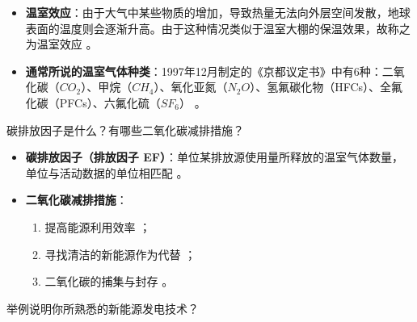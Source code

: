 \begin{solution}
\begin{itemize}
\item \textbf{温室效应}：由于大气中某些物质的增加，导致热量无法向外层空间发散，地球表面的温度则会逐渐升高。由于这种情况类似于温室大棚的保温效果，故称之为温室效应 。
\item \textbf{通常所说的温室气体种类}：1997年12月制定的《京都议定书》中有6种：二氧化碳（\(CO_2\)）、甲烷（\(CH_4\)）、氧化亚氮（\(N_2O\)）、氢氟碳化物（HFCs）、全氟化碳（PFCs）、六氟化硫（\(SF_6\)） 。
\end{itemize}
\end{solution}

\begin{problem}\label{exer:think_01_intro_07}
碳排放因子是什么？有哪些二氧化碳减排措施？
\end{problem}

\begin{solution}
\begin{itemize}
\item \textbf{碳排放因子（排放因子 EF）}：单位某排放源使用量所释放的温室气体数量，单位与活动数据的单位相匹配 。
\item \textbf{二氧化碳减排措施}：
\begin{enumerate}
\item 提高能源利用效率 ；
\item 寻找清洁的新能源作为代替 ；
\item 二氧化碳的捕集与封存 。
\end{enumerate}
\end{itemize}
\end{solution}

\begin{problem}\label{exer:think_01_intro_08}
举例说明你所熟悉的新能源发电技术？
\end{problem}

